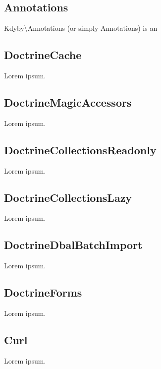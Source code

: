 \subsection{Annotations} \label{sec:state:annotations}

Kdyby\textbackslash{}Annotations (or simply Annotations) is an

\subsection{DoctrineCache} \label{sec:state:doctrine-cache}

Lorem ipsum.

\subsection{DoctrineMagicAccessors} \label{sec:state:doctrine-magic-accessors}

Lorem ipsum.

\subsection{DoctrineCollectionsReadonly} \label{sec:state:doctrine-collections-readonly}

Lorem ipsum.

\subsection{DoctrineCollectionsLazy} \label{sec:state:doctrine-collections-lazy}

Lorem ipsum.

\subsection{DoctrineDbalBatchImport} \label{sec:state:doctrine-dbal-batch-import}

Lorem ipsum.

\subsection{DoctrineForms} \label{sec:state:doctrine-forms}

Lorem ipsum.

\subsection{Curl} \label{sec:state:curl}

Lorem ipsum.

